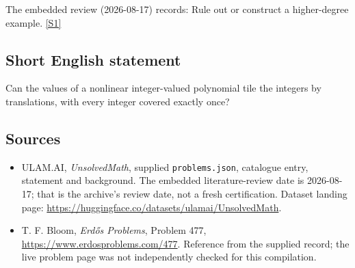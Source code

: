 \documentclass[11pt,a4paper]{article}
\newcommand{\sref}[2]{\hyperlink{source:#1:#2}{[S#2]}}
\begin{document}
The embedded review (2026-08-17) records: Rule out or construct a higher-degree example. \sref{statement}{1}

\subsection{Short English statement}

Can the values of a nonlinear integer-valued polynomial tile the integers by translations, with every integer covered exactly once?

\subsection{Sources}

{\small

\begin{itemize}

\item[\hypertarget{source:statement:1}{S1}] ULAM.AI, \emph{UnsolvedMath}, supplied \texttt{problems.json}, catalogue entry, statement and background. The embedded literature-review date is 2026-08-17; that is the archive’s review date, not a fresh certification. Dataset landing page: \url{https://huggingface.co/datasets/ulamai/UnsolvedMath}.

\item[\hypertarget{source:statement:2}{S2}] T. F. Bloom, \emph{Erdős Problems}, Problem 477, \url{https://www.erdosproblems.com/477}. Reference from the supplied record; the live problem page was not independently checked for this compilation.

\end{itemize}

}

\label{end:statement}
\end{document}
